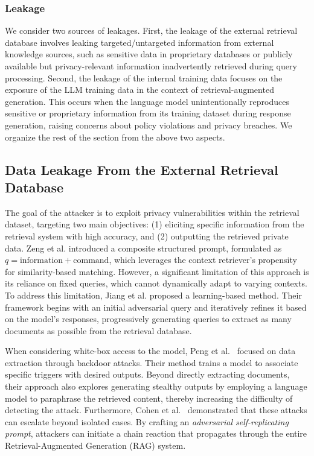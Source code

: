 \subsubsection{Leakage}
We consider two sources of leakages. First, the leakage of the external retrieval database involves leaking targeted/untargeted information from external knowledge sources, such as sensitive data in proprietary databases or publicly available but privacy-relevant information inadvertently retrieved during query processing. Second, the leakage of the internal training data focuses on the exposure of the LLM training data in the context of retrieval-augmented generation. This occurs when the language model unintentionally reproduces sensitive or proprietary information from its training dataset during response generation, raising concerns about policy violations and privacy breaches. We organize the rest of the section from the above two aspects. 

\subsection{Data Leakage From the External Retrieval Database}

The goal of the attacker is to exploit privacy vulnerabilities within the retrieval dataset, targeting two main objectives: (1) eliciting specific information from the retrieval system with high accuracy, and (2) outputting the retrieved private data. Zeng et al.\cite{privacy_rag_2024} introduced a composite structured prompt, formulated as $q = {\text{information}} + {\text{command}}$, which leverages the context retriever's propensity for similarity-based matching. However, a significant limitation of this approach is its reliance on fixed queries, which cannot dynamically adapt to varying contexts. To address this limitation, Jiang et al.\cite{jiang2024ragthief} proposed a learning-based method. Their framework begins with an initial adversarial query and iteratively refines it based on the model's responses, progressively generating queries to extract as many documents as possible from the retrieval database.

When considering white-box access to the model, Peng et al.~\cite{peng2024data} focused on data extraction through backdoor attacks. Their method trains a model to associate specific triggers with desired outputs. Beyond directly extracting documents, their approach also explores generating stealthy outputs by employing a language model to paraphrase the retrieved content, thereby increasing the difficulty of detecting the attack. Furthermore, Cohen et al.~\cite{cohen2024unleashing} demonstrated that these attacks can escalate beyond isolated cases. By crafting an \textit{adversarial self-replicating prompt}, attackers can initiate a chain reaction that propagates through the entire Retrieval-Augmented Generation (RAG) system.

